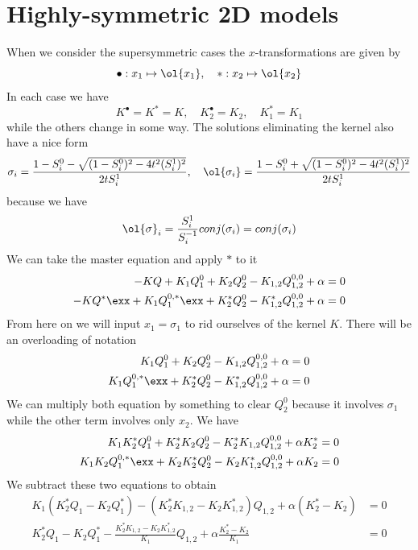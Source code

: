 
\chapter{Highly-symmetric 2D models}
When we consider the supersymmetric cases the $x$-transformations are given by
\[
\bullet : x_1 \mapsto \ol{x_1},\quad\ast: x_2 \mapsto \ol{x_2}
\]
In each case we have
\[
  K^{\bullet} = K^{\ast} = K,\quad K_2^{\bullet} = K_2,\quad K_1^{\ast} = K_1
\]
while the others change in some way. The solutions eliminating the kernel also have a nice form
\[
    \sigma_i = \frac{1-S_i^0-\sqrt{(1-S_i^0)^2-4t^2 (S_i^1)^2}}{2tS_i^1},\quad\ol{\sigma_i} = \frac{1-S_i^0+\sqrt{(1-S_i^0)^2-4t^2 (S_i^1)^2}}{2tS_i^1}
\]
because we have
\[
	\ol{\sigma}_i = \frac{S_i^1}{S_i^{-1}}conj(\sigma_i) = conj(\sigma_i) 
\]
We can take the master equation and apply $\ast$ to it
\begin{align*}
-KQ + K_1 Q_1^0 + K_2 Q_2^0 - K_{1,2}Q_{1,2}^{0,0} + \alpha = 0\\
-KQ^\ast \exx+ K_1 Q_1^{0,\ast} \exx+ K_2^\ast Q_2^0 - K_{1,2}^\ast Q_{1,2}^{0,0} + \alpha = 0
\end{align*}
From here on we will input $x_1 = \sigma_1$ to rid ourselves of the kernel $K$. There will be an overloading of notation
\begin{align*}
K_1 Q_1^0 + K_2 Q_2^0 - K_{1,2}Q_{1,2}^{0,0} + \alpha = 0\\
K_1 Q_1^{0,\ast} \exx+ K_2^\ast Q_2^0 - K_{1,2}^\ast Q_{1,2}^{0,0} + \alpha = 0
\end{align*}
We can multiply both equation by something to clear $Q_2^0$ because it involves $\sigma_1$ while the other term involves only $x_2$. We have
\begin{align*}
K_1 K_2^\ast Q_1^0 +K_2^\ast K_2 Q_2^0 - K_2^\ast K_{1,2}Q_{1,2}^{0,0} + \alpha K_2^\ast= 0\\
K_1 K_2 Q_1^{0,\ast} \exx+ K_2 K_2^\ast Q_2^0 - K_2 K_{1,2}^\ast Q_{1,2}^{0,0} + \alpha K_2 = 0
\end{align*}
We subtract these two equations to obtain
\begin{align*}
    K_1(K_2^\ast Q_1 - K_2 Q_1^\ast) - ( K_2^\ast K_{1,2}- K_2 K_{1,2}^\ast)Q_{1,2}+\alpha (K_2^\ast - K_2) &= 0\\
    K_2^\ast Q_1 - K_2 Q_1^\ast - \frac{ K_2^\ast K_{1,2}- K_2 K_{1,2}^\ast}{K_1}Q_{1,2}+\alpha \frac{K_2^\ast - K_2}{K_1} &= 0\\
\end{align*}
